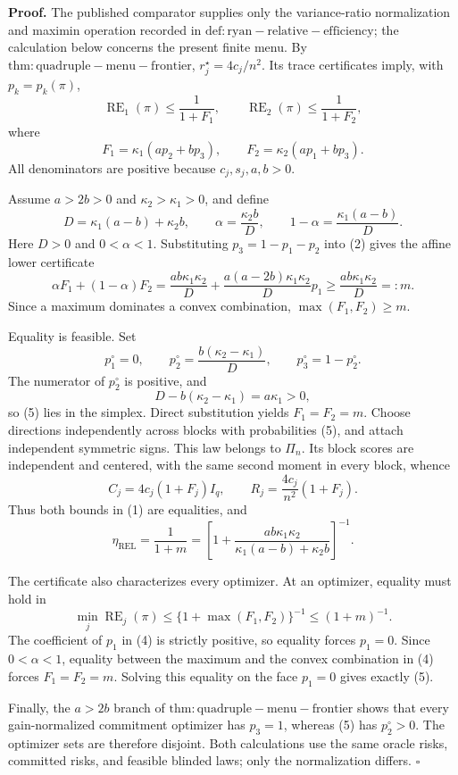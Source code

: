 \textbf{Proof.}
The published comparator supplies only the variance-ratio normalization and maximin operation recorded in \(\mathrm{def:ryan-relative-efficiency}\); the calculation below concerns the present finite menu.  By \(\mathrm{thm:quadruple-menu-frontier}\), \(r_j^\star=4c_j/n^2\).  Its trace certificates imply, with \(p_k=p_k(\pi)\),
\[
\operatorname{RE}_1(\pi)\le\frac1{1+F_1},
\qquad
\operatorname{RE}_2(\pi)\le\frac1{1+F_2},
\tag{1}
\]
where
\[
F_1=\kappa_1(ap_2+bp_3),
\qquad
F_2=\kappa_2(ap_1+bp_3).
\tag{2}
\]
All denominators are positive because \(c_j,s_j,a,b>0\).

Assume \(a>2b>0\) and \(\kappa_2>\kappa_1>0\), and define
\[
D=\kappa_1(a-b)+\kappa_2b,
\qquad
\alpha=\frac{\kappa_2b}{D},
\qquad
1-\alpha=\frac{\kappa_1(a-b)}D.
\tag{3}
\]
Here \(D>0\) and \(0<\alpha<1\).  Substituting \(p_3=1-p_1-p_2\) into (2) gives the affine lower certificate
\[
\alpha F_1+(1-\alpha)F_2
=\frac{ab\kappa_1\kappa_2}{D}
+\frac{a(a-2b)\kappa_1\kappa_2}{D}p_1
\ge \frac{ab\kappa_1\kappa_2}{D}=:m.
\tag{4}
\]
Since a maximum dominates a convex combination, \(\max(F_1,F_2)\ge m\).

Equality is feasible.  Set
\[
p_1^\circ=0,
\qquad
p_2^\circ=\frac{b(\kappa_2-\kappa_1)}D,
\qquad
p_3^\circ=1-p_2^\circ.
\tag{5}
\]
The numerator of \(p_2^\circ\) is positive, and
\[
D-b(\kappa_2-\kappa_1)=a\kappa_1>0,
\tag{6}
\]
so (5) lies in the simplex.  Direct substitution yields \(F_1=F_2=m\).  Choose directions independently across blocks with probabilities (5), and attach independent symmetric signs.  This law belongs to \(\Pi_n\).  Its block scores are independent and centered, with the same second moment in every block, whence
\[
C_j=4c_j(1+F_j)I_q,
\qquad
R_j=\frac{4c_j}{n^2}(1+F_j).
\tag{7}
\]
Thus both bounds in (1) are equalities, and
\[
\eta_{\mathrm{REL}}
=\frac1{1+m}
=\left[1+\frac{ab\kappa_1\kappa_2}{\kappa_1(a-b)+\kappa_2b}\right]^{-1}.
\tag{8}
\]

The certificate also characterizes every optimizer.  At an optimizer, equality must hold in
\[
\min_j\operatorname{RE}_j(\pi)
\le\{1+\max(F_1,F_2)\}^{-1}
\le(1+m)^{-1}.
\tag{9}
\]
The coefficient of \(p_1\) in (4) is strictly positive, so equality forces \(p_1=0\).  Since \(0<\alpha<1\), equality between the maximum and the convex combination in (4) forces \(F_1=F_2=m\).  Solving this equality on the face \(p_1=0\) gives exactly (5).

Finally, the \(a>2b\) branch of \(\mathrm{thm:quadruple-menu-frontier}\) shows that every gain-normalized commitment optimizer has \(p_3=1\), whereas (5) has \(p_2^\circ>0\).  The optimizer sets are therefore disjoint.  Both calculations use the same oracle risks, committed risks, and feasible blinded laws; only the normalization differs. \(\square\)